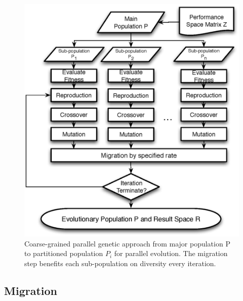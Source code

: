       \begin{figure}[t]
        \centering
        \includegraphics[width=\textwidth]{Fig/PAGEflowchart.eps}
        \caption{Coarse-grained parallel genetic approach from major population P to partitioned population $P_i$ for parallel evolution. The migration step benefits each sub-population on diversity every iteration.} 
        \label{fig:PGAFlow}
      \end{figure}

    \subsection{Migration}  

